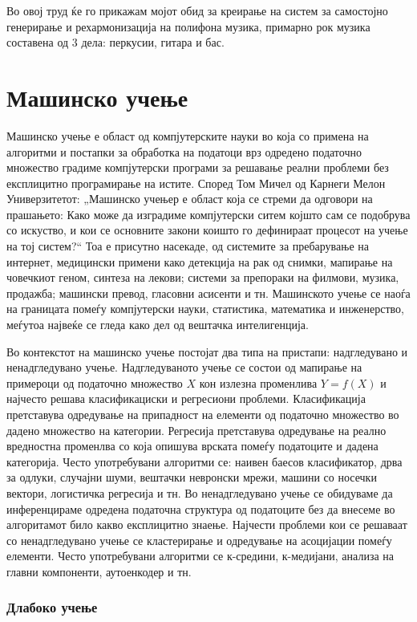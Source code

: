 Во овој труд ќе го прикажам мојот обид за креирање на систем за самостојно генерирање и рехармонизација на полифона музика, примарно рок музика составена од 3 дела: перкусии, гитара и бас.

\chapter{Машинско учење}
\label{ch:masinsko}

Машинско учење е област од компјутерските науки во која со примена на алгоритми и постапки за обработка на податоци врз одредено податочно множество градиме компјутерски програми за решавање реални проблеми без експлицитно програмирање на истите. Според Том Мичел од Карнеги Мелон Универзитетот: „Машинско учењер е област која се стреми да одговори на прашањето: Како може да изградиме компјутерски ситем којшто сам се подобрува со искуство, и кои се основните закони коишто го дефинираат процесот на учење на тој систем?“ Тоа е присутно насекаде, од системите за пребарување на интернет, медицински примени како детекција на рак од снимки, мапирање на човечкиот геном, синтеза на лекови; системи за препораки на филмови, музика, продажба; машински превод, гласовни асисенти и тн. Машинското учење се наоѓа на границата помеѓу компјутерски науки, статистика, математика и инженерство, меѓутоа највеќе се гледа како дел од вештачка интелигенција.

Во контекстот на машинско учење постојат два типа на пристапи: надгледувано и ненадгледувано учење. Надгледуваното учење се состои од мапирање на примероци од податочно множество $X$ кон излезна променлива $Y=f(X)$ и најчесто решава класификациски и регресиони проблеми. Класификација претставува одредување на припадност на елементи од податочно множество во дадено множество на категории. Регресија претставува одредување на реално вредностна променлва со која опишува врската помеѓу податоците и дадена категорија. Често употребувани алгоритми се: наивен баесов класификатор, дрва за одлуки, случајни шуми, вештачки невронски мрежи, машини со носечки вектори, логистичка регресија и тн. 
Во ненадгледувано учење се обидуваме да инференцираме одредена податочна структура од податоците без да внесеме во алгоритамот било какво експлицитно знаење. Најчести проблеми кои се решаваат со ненадгледувано учење се кластерирање и одредување на асоцијации помеѓу елементи. Често употребувани алгоритми се к-средини, к-медијани, анализа на главни компоненти, аутоенкодер и тн.

\subsection{Длабоко учење}

